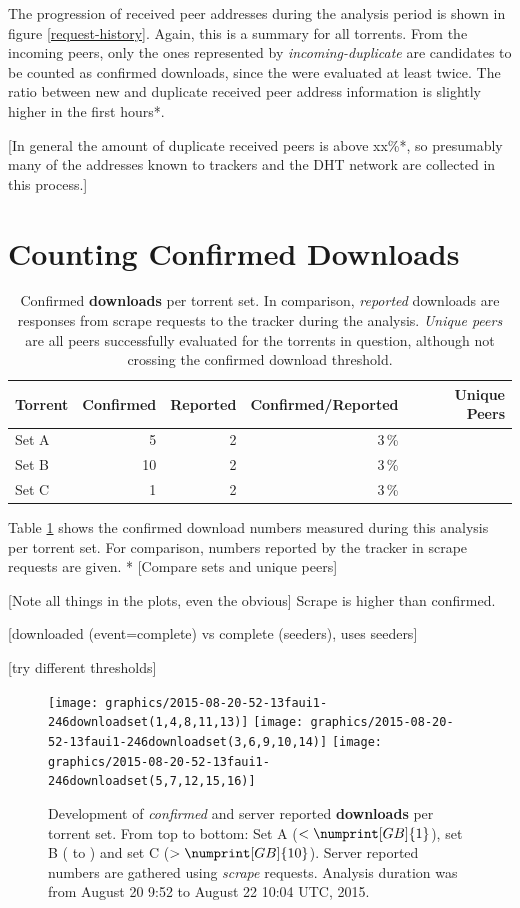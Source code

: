 \documentclass[10pt, a4paper, twoside, headsepline]{scrbook}
\renewcommand{\_}{\origunderscore\allowbreak}
\newcommand{\range}{from August 20 9:52 to August 22 10:04 UTC, 2015} %
\begin{document}
The progression of received peer addresses during the analysis period is shown in figure \ref{request-history}. Again, this is a summary for all torrents. From the incoming peers, only the ones represented by \emph{incoming-duplicate} are candidates to be counted as confirmed downloads, since the were evaluated at least twice. The ratio between new and duplicate received peer address information is slightly higher in the first hours*.

[In general the amount of duplicate received peers is above xx\%*, so presumably many of the addresses known to trackers and the DHT network are collected in this process.]

\section{Counting Confirmed Downloads}
\begin{table}
\centering
\begin{tabular}{lrrrr}
\toprule
Torrent & Confirmed & Reported & Confirmed/Reported & Unique Peers \\
\midrule
Set A & 5 & 2 & 3\,\% \\
Set B & 10 & 2 & 3\,\% \\
Set C & 1 & 2 & 3\,\% \\
\bottomrule
\end{tabular}
\caption[Confirmed downloads per torrent set]{Confirmed \textbf{downloads} per torrent set. In comparison, \emph{reported} downloads are responses from scrape requests to the tracker during the analysis. \emph{Unique peers} are all peers successfully evaluated for the torrents in question, although not crossing the confirmed download threshold.}
\label{confirmed-downloads}
\end{table}

Table \ref{confirmed-downloads} shows the confirmed download numbers measured during this analysis per torrent set. For comparison, numbers reported by the tracker in scrape requests are given. * [Compare sets and unique peers]

[Note all things in the plots, even the obvious] Scrape is higher than confirmed.

[downloaded (event=complete) vs complete (seeders), \cite{watters2011much} uses seeders]

[try different thresholds]

\begin{figure}
\centering
\texttt{[image: graphics/2015-08-20\_11-52-13\_faui1-246\_download\_set\_(1,4,8,11,13)]}
\texttt{[image: graphics/2015-08-20\_11-52-13\_faui1-246\_download\_set\_(3,6,9,10,14)]}
\texttt{[image: graphics/2015-08-20\_11-52-13\_faui1-246\_download\_set\_(5,7,12,15,16)]}
\caption[Development of confirmed and reported downloads per torrent set]{Development of \emph{confirmed} and server reported \textbf{downloads} per torrent set. From top to bottom: Set A ($<\numprint[GB]{1}$), set B ( to ) and set C ($>\numprint[GB]{10}$). Server reported numbers are gathered using \emph{scrape} requests. Analysis duration was \range.}
\label{download-history}
\end{figure}
\end{document}
